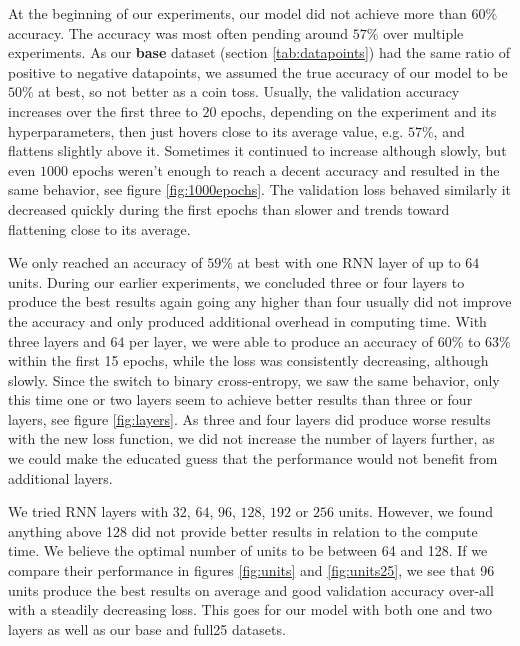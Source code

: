 \documentclass[
	ngerman,
	ruledheaders=section,%
	class=report,%
	thesis={type=bachelor},%
	accentcolor=9c,%
	custommargins=true,%
	marginpar=false,%
	parskip=half-,%
	fontsize=11pt,%
	twoside
]{tudapub}
\begin{document}
At the beginning of our experiments, our model did not achieve more than $60\%$ accuracy.
The accuracy was most often pending around $57\%$ over multiple experiments.
As our \textbf{base} dataset (section \ref{tab:datapoints}) had the same ratio of positive to negative datapoints, we assumed the true accuracy of our model to be $50\%$ at best, so not better as a coin toss.
Usually, the validation accuracy increases over the first three to $20$ epochs, depending on the experiment and its hyperparameters, then just hovers close to its average value, e.g. $57\%$, and flattens slightly above it.
Sometimes it continued to increase although slowly, but even $1000$ epochs weren't enough to reach a decent accuracy and resulted in the same behavior, see figure \ref{fig:1000epochs}.
The validation loss behaved similarly it decreased quickly during the first epochs than slower and trends toward flattening close to its average.

We only reached an accuracy of $59\%$ at best with one RNN layer of up to $64$ units.
During our earlier experiments, we concluded three or four layers to produce the best results again going any higher than four usually did not improve the accuracy and only produced additional overhead in computing time.
With three layers and $64$ per layer, we were able to produce an accuracy of $60\%$ to $63\%$ within the first 15 epochs, while the loss was consistently decreasing, although slowly.
Since the switch to binary cross-entropy, we saw the same behavior, only this time one or two layers seem to achieve better results than three or four layers, see figure \ref{fig:layers}.
As three and four layers did produce worse results with the new loss function, we did not increase the number of layers further, as we could make the educated guess that the performance would not benefit from additional layers.

We tried RNN layers with $32$, $64$, $96$, $128$, $192$ or $256$ units.
However, we found anything above 128 did not provide better results in relation to the compute time.
We believe the optimal number of units to be between 64 and 128.
If we compare their performance in figures \ref{fig:units} and \ref{fig:units25}, we see that 96 units produce the best results on average and good validation accuracy over-all with a steadily decreasing loss.
This goes for our model with both one and two layers as well as our base and full25 datasets.
\end{document}

